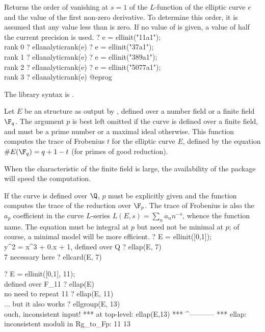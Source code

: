 \label{se:ellanalyticrank}
Returns the order of vanishing at $s=1$ of the $L$-function of the
elliptic curve $e$ and the value of the first non-zero derivative. To
determine this order, it is assumed that any value less than  is
zero. If no value of  is given, a value of half the current
precision is used.
\bprog
? e = ellinit("11a1"); \\ rank 0
? ellanalyticrank(e)
? e = ellinit("37a1"); \\ rank 1
? ellanalyticrank(e)
? e = ellinit("389a1"); \\ rank 2
? ellanalyticrank(e)
? e = ellinit("5077a1"); \\ rank 3
? ellanalyticrank(e)
@eprog

The library syntax is .

\label{se:ellap}
Let $E$ be an  structure as output by , defined over
a number field or a finite field $\F_q$. The argument $p$ is best left
omitted if the curve is defined over a finite field, and must be a prime
number or a maximal ideal otherwise. This function computes the trace of
Frobenius $t$ for the elliptic curve $E$, defined by the equation $\#E(\F_q)
= q+1 - t$ (for primes of good reduction).

When the characteristic of the finite field is large, the availability of
the  package will speed the computation.

If the curve is defined over $\Q$, $p$ must be explicitly given and the
function computes the trace of the reduction over $\F_p$.
The trace of Frobenius is also the $a_p$ coefficient in the curve $L$-series
$L(E,s) = \sum_n a_n n^{-s}$, whence the function name. The equation must be
integral at $p$ but need not be minimal at $p$; of course, a minimal model
will be more efficient.
\bprog
? E = ellinit([0,1]);  \\ y^2 = x^3 + 0.x + 1, defined over Q
? ellap(E, 7) \\ 7 necessary here
? ellcard(E, 7)

? E = ellinit([0,1], 11);  \\ defined over F_11
? ellap(E)       \\ no need to repeat 11
? ellap(E, 11)   \\ ... but it also works
? ellgroup(E, 13) \\ ouch, inconsistent input!
   ***   at top-level: ellap(E,13)
   ***                 ^-----------
   *** ellap: inconsistent moduli in Rg_to_Fp:
     11
     13

